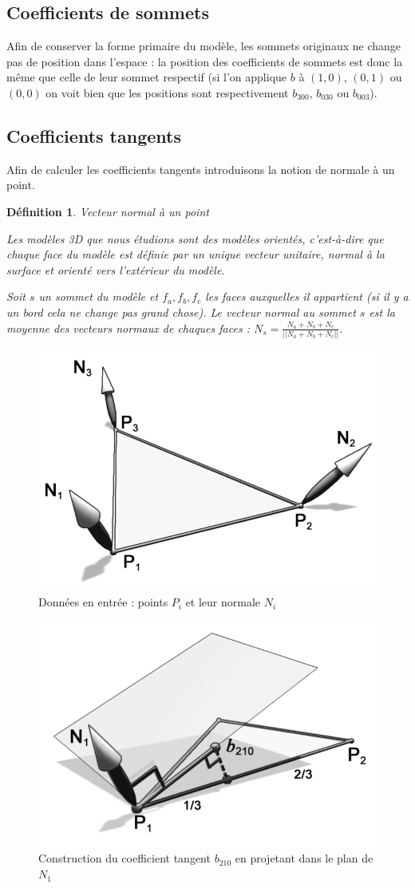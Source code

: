 \documentclass{article}
\newtheorem{definition}{Définition}
\begin{document}
\subsection{Coefficients de sommets}
Afin de conserver la forme primaire du modèle, les sommets originaux ne change
pas de position dans l'espace : la position des coefficients de sommets est
donc la même que celle de leur sommet respectif (si l'on applique $b$ à
$(1,0)$, $(0,1)$ ou $(0,0)$ on voit bien que les positions sont respectivement
$b_{300}$, $b_{030}$ ou $b_{003}$).

\subsection{Coefficients tangents}
Afin de calculer les coefficients tangents introduisons la notion de normale à
un point.

\begin{definition}{Vecteur normal à un point}

Les modèles 3D que nous étudions sont des modèles orientés, c'est-à-dire que
chaque face du modèle est définie par un unique vecteur unitaire, normal à la
surface et orienté vers l'extérieur du modèle.

Soit $s$ un sommet du modèle et $f_a,f_b,f_c$ les faces auxquelles il
appartient (si il y a un bord cela ne change pas grand chose). Le vecteur
normal au sommet $s$ est la moyenne des vecteurs normaux de chaques faces :
$N_s = \frac{N_a + N_b + N_c}{||N_a + N_b + N_c||}$.
\end{definition}

\begin{figure}[ht!]
\centering
    \includegraphics[width=0.4\linewidth]{normals}
    \caption{Données en entrée : points $P_i$ et leur normale $N_i$}
    \label{fig:normals}
\end{figure}

\begin{figure}[ht!]
\centering
    \includegraphics[width=0.4\linewidth]{tangent}
    \caption{Construction du coefficient tangent $b_{210}$ en projetant dans le
plan de $N_1$}
    \label{fig:tangent}
\end{figure}
\end{document}
